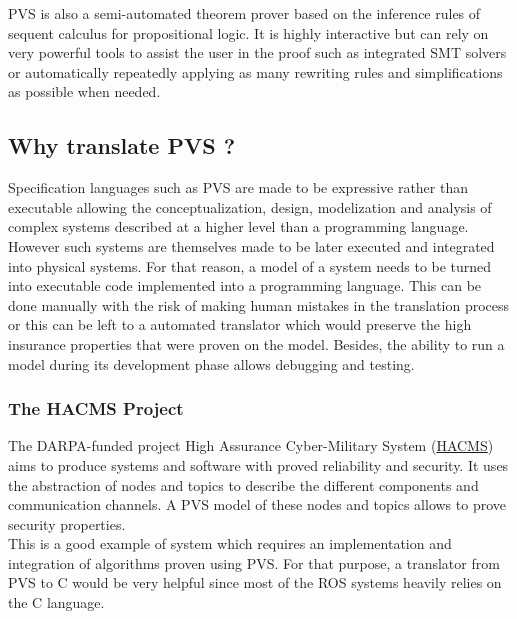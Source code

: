 \documentclass[12pt,a4paper]{article}
\begin{document}
PVS is also a semi-automated theorem prover \cite{PVS:prover} based on the inference rules of sequent calculus for propositional logic. It is highly interactive but can rely on very powerful tools to assist the user in the proof such as integrated SMT solvers or automatically repeatedly applying as many rewriting rules and simplifications as possible when needed.

\subsection{Why translate PVS ?}

Specification languages such as PVS are made to be expressive rather than executable allowing the conceptualization, design, modelization and analysis of complex systems described at a higher level than a programming language. \\

However such systems are themselves made to be later executed and integrated into physical systems. For that reason, a model of a system needs to be turned into executable code implemented into a programming language. This can be done manually with the risk of making human mistakes in the translation process or this can be left to a automated translator which would preserve the high insurance properties that were proven on the model. Besides, the ability to run a model during its development phase allows debugging and testing.




\subsubsection*{The HACMS Project}

The DARPA-funded project High Assurance Cyber-Military System (\href{http://www.darpa.mil/Our_Work/I2O/Programs/High-Assurance_Cyber_Military_Systems_(HACMS).aspx}{HACMS}) aims to produce systems and software with proved reliability and security. It uses the abstraction of nodes and topics to describe the different components and communication channels. A PVS model of these nodes and topics allows to prove security properties. \\

This is a good example of system which requires an implementation and integration of algorithms proven using PVS. For that purpose, a translator from PVS to C would be very helpful since most of the ROS systems heavily relies on the C language.
\end{document}
